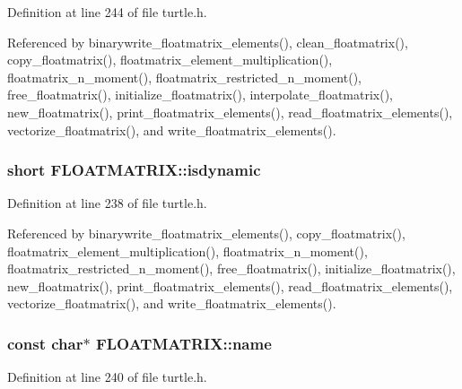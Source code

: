 Definition at line 244 of file turtle.\-h.



Referenced by binarywrite\-\_\-floatmatrix\-\_\-elements(), clean\-\_\-floatmatrix(), copy\-\_\-floatmatrix(), floatmatrix\-\_\-element\-\_\-multiplication(), floatmatrix\-\_\-n\-\_\-moment(), floatmatrix\-\_\-restricted\-\_\-n\-\_\-moment(), free\-\_\-floatmatrix(), initialize\-\_\-floatmatrix(), interpolate\-\_\-floatmatrix(), new\-\_\-floatmatrix(), print\-\_\-floatmatrix\-\_\-elements(), read\-\_\-floatmatrix\-\_\-elements(), vectorize\-\_\-floatmatrix(), and write\-\_\-floatmatrix\-\_\-elements().

\hypertarget{struct_f_l_o_a_t_m_a_t_r_i_x_ae4b139ff9c3027f34ed485e2541aabb3}{
\subsubsection[{isdynamic}]{\setlength{\rightskip}{0pt plus 5cm}short F\-L\-O\-A\-T\-M\-A\-T\-R\-I\-X\-::isdynamic}}\label{struct_f_l_o_a_t_m_a_t_r_i_x_ae4b139ff9c3027f34ed485e2541aabb3}


Definition at line 238 of file turtle.\-h.



Referenced by binarywrite\-\_\-floatmatrix\-\_\-elements(), copy\-\_\-floatmatrix(), floatmatrix\-\_\-element\-\_\-multiplication(), floatmatrix\-\_\-n\-\_\-moment(), floatmatrix\-\_\-restricted\-\_\-n\-\_\-moment(), free\-\_\-floatmatrix(), initialize\-\_\-floatmatrix(), new\-\_\-floatmatrix(), print\-\_\-floatmatrix\-\_\-elements(), read\-\_\-floatmatrix\-\_\-elements(), vectorize\-\_\-floatmatrix(), and write\-\_\-floatmatrix\-\_\-elements().

\hypertarget{struct_f_l_o_a_t_m_a_t_r_i_x_ab82fb414421032903bd15335e35fa892}{
\subsubsection[{name}]{\setlength{\rightskip}{0pt plus 5cm}const char$\ast$ F\-L\-O\-A\-T\-M\-A\-T\-R\-I\-X\-::name}}\label{struct_f_l_o_a_t_m_a_t_r_i_x_ab82fb414421032903bd15335e35fa892}


Definition at line 240 of file turtle.\-h.

